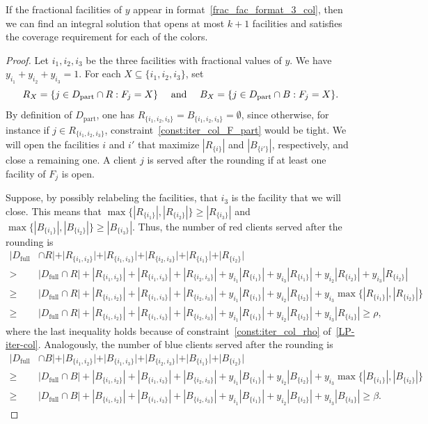 \begin{lemma}
\label{lem:format3_col}
If the fractional facilities of $y$ appear in format~\ref{frac_fac_format_3_col}, then we can find an integral solution that opens at most $k+1$ facilities and satisfies the coverage requirement for each of the colors.
\end{lemma}
\begin{proof}
Let $i_1,i_2,i_3$ be the three facilities with fractional values of $y$. We have $y_{i_1} + y_{i_2} + y_{i_3} = 1$. For each $X \subseteq \{i_1,i_2,i_3\}$, set
\[R_X = \{j \in D_\text{part} \cap R : F_j = X\} \text{ \quad and \quad } B_X = \{j \in D_\text{part} \cap B : F_j = X\}.\]
By definition of $D_\text{part}$, one has $R_{\{i_1,i_2,i_3\}} = B_{\{i_1,i_2,i_3\}} = \emptyset$, since otherwise, for instance if $j \in R_{\{i_1,i_2,i_3\}}$, constraint~\eqref{const:iter_col_F_part} would be tight.
We will open the facilities $i$ and $i'$ that maximize $|R_{\{i\}}|$ and $|B_{\{i'\}}|$, respectively, and close a remaining one. A client $j$ is served after the rounding if at least one facility of $F_j$ is open.

Suppose, by possibly relabeling the facilities, that $i_3$ is the facility that we will close. This means that $\max\{|R_{\{i_1\}}|,|R_{\{i_2\}}|\} \geq |R_{\{i_3\}}|$ and $\max\{|B_{\{i_1\}}|,|B_{\{i_2\}}|\} \geq |B_{\{i_3\}}|$. Thus, the number of red clients served after the rounding is
\begin{align*}
    |D_\text{full} & \cap R| + |R_{\{i_1,i_2\}}| + |R_{\{i_1,i_3\}}| + |R_{\{i_2,i_3\}}| + |R_{\{i_1\}}| + |R_{\{i_2\}}|\\
    > \ & |D_\text{full} \cap R| + |R_{\{i_1,i_2\}}| + |R_{\{i_1,i_3\}}| + |R_{\{i_2,i_3\}}| + y_{i_1} |R_{\{i_1\}}| + y_{i_3} |R_{\{i_1\}}| + y_{i_2}|R_{\{i_2\}}| + y_{i_3} |R_{\{i_2\}}| \\
    \ge \ & |D_\text{full} \cap R| + |R_{\{i_1,i_2\}}| + |R_{\{i_1,i_3\}}| + |R_{\{i_2,i_3\}}| + y_{i_1} |R_{\{i_1\}}| + y_{i_2}|R_{\{i_2\}}| + y_{i_3} \max \{|R_{\{i_1\}}|,|R_{\{i_2\}}|\} \\
    \ge \ & |D_\text{full} \cap R| + |R_{\{i_1,i_2\}}| + |R_{\{i_1,i_3\}}| + |R_{\{i_2,i_3\}}| + y_{i_1} |R_{\{i_1\}}| + y_{i_2}|R_{\{i_2\}}| + y_{i_3} |R_{\{i_3\}}| \ge \rho,
\end{align*}
where the last inequality holds because of constraint~\eqref{const:iter_col_rho} of~\eqref{LP-iter-col}. Analogously, the number of blue clients served after the rounding is
\begin{align*}
    |D_\text{full} & \cap B| + |B_{\{i_1,i_2\}}| + |B_{\{i_1,i_3\}}| + |B_{\{i_2,i_3\}}| + |B_{\{i_1\}}| + |B_{\{i_2\}}|\\
    \ge \ & |D_\text{full} \cap B| + |B_{\{i_1,i_2\}}| + |B_{\{i_1,i_3\}}| + |B_{\{i_2,i_3\}}| + y_{i_1} |B_{\{i_1\}}| + y_{i_2}|B_{\{i_2\}}| + y_{i_3} \max \{|B_{\{i_1\}}|,|B_{\{i_2\}}|\} \\
    \ge \ & |D_\text{full} \cap B| + |B_{\{i_1,i_2\}}| + |B_{\{i_1,i_3\}}| + |B_{\{i_2,i_3\}}| + y_{i_1} |B_{\{i_1\}}| + y_{i_2}|B_{\{i_2\}}| + y_{i_3} |B_{\{i_3\}}| \ge \beta.
\end{align*}
\end{proof}

